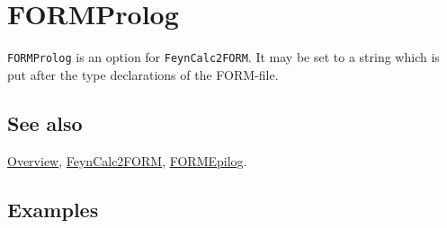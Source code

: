 \documentclass[../FeynCalcManual.tex]{subfiles}
\begin{document}
\hypertarget{formprolog}{%
\section{FORMProlog}\label{formprolog}}

\texttt{FORMProlog} is an option for \texttt{FeynCalc2FORM}. It may be
set to a string which is put after the type declarations of the
FORM-file.

\subsection{See also}

\hyperlink{toc}{Overview}, \hyperlink{feyncalc2form}{FeynCalc2FORM},
\hyperlink{formepilog}{FORMEpilog}.

\subsection{Examples}
\end{document}
